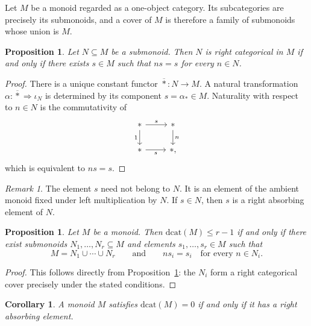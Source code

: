 \documentclass[12pt]{amsart}
\newtheorem{corollary}[teo]{Corollary}
\newtheorem{prop}[teo]{Proposition}
\theoremstyle{definition}
\theoremstyle{remark}
\newtheorem{remark}{Remark}
\numberwithin{figure}{section}%
\begin{document}
Let \(M\) be a monoid regarded as a one-object category. Its subcategories
are precisely its submonoids, and a cover of \(M\) is therefore a family of
submonoids whose union is \(M\).

\begin{prop}\label{prop:categorical_submonoids}
Let \(N\subseteq M\) be a submonoid. Then \(N\) is right categorical in
\(M\) if and only if there exists \(s\in M\) such that \(ns=s\) for every
\(n\in N\).
\end{prop}

\begin{proof}
There is a unique constant functor
\(\overline{\ast}\colon N\to M\). A natural transformation
\(\alpha\colon\overline{\ast}\Rightarrow\iota_N\) is determined by its
component \(s=\alpha_\ast\in M\). Naturality with respect to \(n\in N\)
is the commutativity of
\[
\begin{tikzcd}
\ast \arrow[r, "s"] \arrow[d, "1"'] &
\ast \arrow[d, "n"] \\
\ast \arrow[r, "s"'] &
\ast ,
\end{tikzcd}
\]
which is equivalent to \(ns=s\).
\end{proof}

\begin{remark}
The element \(s\) need not belong to \(N\). It is an element of the ambient
monoid fixed under left multiplication by \(N\). If \(s\in N\), then \(s\)
is a right absorbing element of \(N\).
\end{remark}

\begin{prop}\label{prop:dcat_monoid_cover}
Let \(M\) be a monoid. Then \(\mathrm{dcat}(M)\leq r-1\) if and only if
there exist submonoids \(N_1,\ldots,N_r\subseteq M\) and elements
\(s_1,\ldots,s_r\in M\) such that
\[
M=N_1\cup\cdots\cup N_r
\qquad\text{and}\qquad
ns_i=s_i
\quad
\text{for every }n\in N_i.
\]
\end{prop}

\begin{proof}
This follows directly from
Proposition~\ref{prop:categorical_submonoids}: the \(N_i\) form a right
categorical cover precisely under the stated conditions.
\end{proof}

\begin{corollary}\label{cor:dcat_zero_monoid}
A monoid \(M\) satisfies \(\mathrm{dcat}(M)=0\) if and only if it has a
right absorbing element.
\end{corollary}
\end{document}
